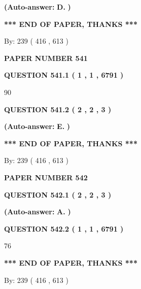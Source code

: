 \documentclass{ctexart}
\begin{document}
 
{\textbf{(Auto-answer:}}
{\textbf{\large{
D.}}}
{\textbf{)}}
 
 
   
   
   
   
\vspace{1.0in} 
{\textbf{\large{ *** END OF PAPER, THANKS *** }}} 
   
   
\hspace{1.0in} By: 
 239 ( 416 ,  613 )
   
   
   
   
\newpage 
\setcounter{page}{ 
   541001 } 
   
   
 {\textbf{ \Large{ PAPER NUMBER  541  }}}
   
   
   
   
  
  
{\textbf{\large{QUESTION
541.1 
 ( 1 , 1 , 6791 )
}}}

90
  
  
{\textbf{\large{QUESTION
541.2 
 ( 2 , 2 , 3 )
}}}
 
 
{\textbf{(Auto-answer:}}
{\textbf{\large{
E.}}}
{\textbf{)}}
 
 
   
   
   
   
\vspace{1.0in} 
{\textbf{\large{ *** END OF PAPER, THANKS *** }}} 
   
   
\hspace{1.0in} By: 
 239 ( 416 ,  613 )
   
   
   
   
\newpage 
\setcounter{page}{ 
   542001 } 
   
   
 {\textbf{ \Large{ PAPER NUMBER  542  }}}
   
   
   
   
  
  
{\textbf{\large{QUESTION
542.1 
 ( 2 , 2 , 3 )
}}}
 
 
{\textbf{(Auto-answer:}}
{\textbf{\large{
A.}}}
{\textbf{)}}
 
 
  
  
{\textbf{\large{QUESTION
542.2 
 ( 1 , 1 , 6791 )
}}}

76
   
   
   
   
\vspace{1.0in} 
{\textbf{\large{ *** END OF PAPER, THANKS *** }}} 
   
   
\hspace{1.0in} By: 
 239 ( 416 ,  613 )
   
   
   
\end{document}
